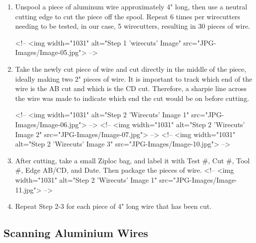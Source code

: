 \documentclass[fleqn,10pt]{wlscirep}
\begin{document}
\begin{enumerate}
  \item
  Unspool a piece of aluminum wire approximately 4" long, then use a neutral cutting edge to cut the piece off the spool. Repeat 6 times per wirecutters needing to be tested, in our case, 5 wirecutters, resulting in 30 pieces of wire.

<!-- <img width="1031" alt="Step 1 'wirecuts' Image" src="JPG-Images/Image-05.jpg"> -->

  \item
  Take the newly cut piece of wire and cut directly in the middle of the piece, ideally making two 2" pieces of wire. It is important to track which end of the wire is the AB cut and which is the CD cut. Therefore, a sharpie line across the wire was made to indicate which end the cut would be on before cutting.


<!-- <img width="1031" alt="Step 2 'Wirecuts' Image 1" src="JPG-Images/Image-06.jpg"> -->
<!-- <img width="1031" alt="Step 2 'Wirecuts' Image 2" src="JPG-Images/Image-07.jpg"> -->
<!-- <img width="1031" alt="Step 2 'Wirecuts' Image 3" src="JPG-Images/Image-10.jpg"> -->

  \item
  After cutting, take a small Ziploc bag, and label it with Test \#, Cut \#, Tool \#, Edge AB/CD, and Date. Then package the pieces of wire.
<!-- <img width="1031" alt="Step 2 'Wirecuts' Image 1" src="JPG-Images/Image-11.jpg"> -->

  \item
  Repeat Step 2-3 for each piece of 4" long wire that has been cut.
\end{enumerate}

\subsection*{Scanning Aluminium Wires}
\end{document}
